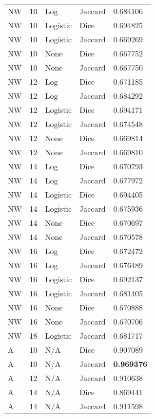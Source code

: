 \documentclass{article}
\begin{document}
\begin{center}
\begin{supertabular}{| l | l | l | l | l |}
            NW & 10 & Log & Jaccard & 0.684106 \\
            NW & 10 & Logistic & Dice & 0.694825 \\
            NW & 10 & Logistic & Jaccard & 0.669269 \\
            NW & 10 & None & Dice & 0.667752 \\
            NW & 10 & None & Jaccard & 0.667750 \\
            NW & 12 & Log & Dice & 0.671185 \\
            NW & 12 & Log & Jaccard & 0.684292 \\
            NW & 12 & Logistic & Dice & 0.694171 \\
            NW & 12 & Logistic & Jaccard & 0.674548 \\
            NW & 12 & None & Dice & 0.669814 \\
            NW & 12 & None & Jaccard & 0.669810 \\
            NW & 14 & Log & Dice & 0.670793 \\
            NW & 14 & Log & Jaccard & 0.677972 \\
            NW & 14 & Logistic & Dice & 0.694405 \\
            NW & 14 & Logistic & Jaccard & 0.675936 \\
            NW & 14 & None & Dice & 0.670697 \\
            NW & 14 & None & Jaccard & 0.670578 \\
            NW & 16 & Log & Dice & 0.672472 \\
            NW & 16 & Log & Jaccard & 0.676489 \\
            NW & 16 & Logistic & Dice & 0.692137 \\
            NW & 16 & Logistic & Jaccard & 0.681405 \\
            NW & 16 & None & Dice & 0.670888 \\
            NW & 16 & None & Jaccard & 0.670706 \\
            NW & 18 & Logistic & Jaccard & 0.681717 \\
            A & 10 & N/A & Dice & 0.907089 \\
            A & 10 & N/A & Jaccard & \textbf{0.969376} \\
            A & 12 & N/A & Jaccard & 0.910638 \\
            A & 14 & N/A & Dice & 0.869441 \\
            A & 14 & N/A & Jaccard & 0.911598 \\

\end{supertabular}
\end{center}
\end{document}
